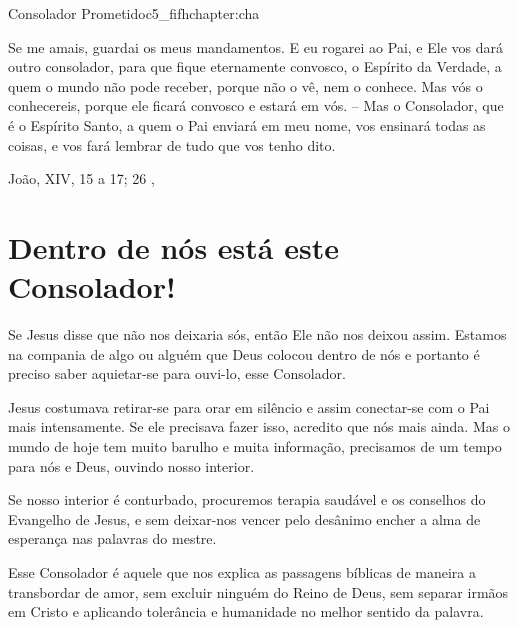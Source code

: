 \begin{chapterpage}{Consolador Prometido}{c5_fifhchapter:cha}

\begin{myquotation} Se me amais, guardai os meus mandamentos. E eu rogarei ao Pai, e Ele vos dará outro consolador, para que fique eternamente convosco, o Espírito da Verdade, a quem o mundo não pode receber, porque não o vê, nem o conhece. Mas vós o conhecereis, porque ele ficará convosco e estará em vós. -- Mas o Consolador, que é o Espírito Santo, a quem o Pai enviará em meu nome, vos ensinará todas as coisas, e vos fará lembrar de tudo que vos tenho dito. 
\par\vspace*{15mm}
\mbox{}\hfill \emdash{}João, XIV, 15 a 17; 26 
, %
\par\end{myquotation}

\end{chapterpage}



\section{Dentro de nós está este Consolador!}\label{c1_basicformatting:sec}

\emdash{}Se Jesus disse que não nos deixaria sós, então Ele não nos deixou assim. Estamos na compania de algo ou alguém que Deus colocou dentro de nós e portanto é preciso saber aquietar-se para ouvi-lo, esse Consolador.

\emdash{}Jesus costumava retirar-se para orar em silêncio e assim conectar-se com o Pai mais intensamente. Se ele precisava fazer isso, acredito que nós mais ainda. Mas o mundo de hoje tem muito barulho e muita informação, precisamos de um tempo para nós e Deus, ouvindo nosso interior.

\emdash{}Se nosso interior é conturbado, procuremos terapia saudável e os conselhos do Evangelho de Jesus, e sem deixar-nos vencer pelo desânimo encher a alma de esperança nas palavras do mestre.

\emdash{}Esse Consolador é aquele que nos explica as passagens bíblicas de maneira a transbordar de amor, sem excluir ninguém do Reino de Deus, sem separar irmãos em Cristo e aplicando tolerância e humanidade no melhor sentido da palavra.

